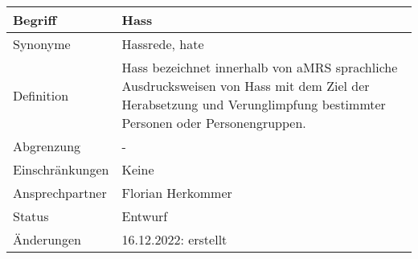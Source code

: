 \begin{table}[H]
    \centering
    \label{hass}
    \begin{tabularx}{\textwidth}{| l | X |}
        \hline
        Begriff         & Hass                                                                                                                                                               \\
        \hline
        Synonyme        & Hassrede, hate                                                                                                                                                     \\
        \hline
        Definition      & Hass bezeichnet innerhalb von aMRS sprachliche Ausdrucksweisen von Hass mit dem Ziel der Herabsetzung und Verunglimpfung bestimmter Personen oder Personengruppen. \\
        \hline
        Abgrenzung      & -                                                                                                                                                                  \\
        \hline
        Einschränkungen & Keine                                                                                                                                                              \\
        \hline
        Ansprechpartner & Florian Herkommer                                                                                                                                                  \\
        \hline
        Status          & Entwurf                                                                                                                                                            \\
        \hline
        Änderungen      & 16.12.2022: erstellt                                                                                                                                               \\
        \hline
    \end{tabularx}
\end{table}


